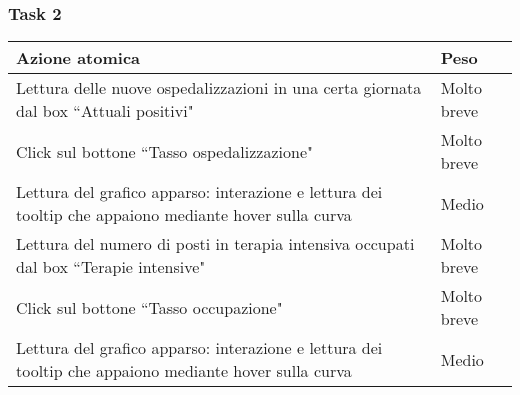 \subsubsection{Task 2}
\label{sss:iaa-task-2}

{
\renewcommand{\arraystretch}{2}
\begin{longtable}[h]{| p{14cm} | p{2.5cm} |}
    \hline
    \textbf{Azione atomica} & \textbf{Peso} \\
    \hline
    \endhead
    Lettura delle nuove ospedalizzazioni in una certa giornata dal box ``Attuali positivi" & Molto breve \\
    \hline
    Click sul bottone ``Tasso ospedalizzazione" & Molto breve \\
    \hline
    Lettura del grafico apparso: interazione e lettura dei tooltip che appaiono mediante hover sulla curva & Medio \\
    \hline
    Lettura del numero di posti in terapia intensiva occupati dal box ``Terapie intensive" & Molto breve \\
    \hline
    Click sul bottone ``Tasso occupazione" & Molto breve \\
    \hline
    Lettura del grafico apparso: interazione e lettura dei tooltip che appaiono mediante hover sulla curva & Medio \\
    \hline
\end{longtable}
}
